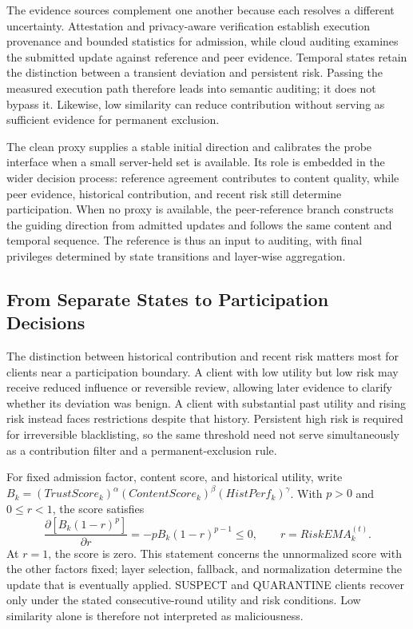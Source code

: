 \documentclass[runningheads,orivec]{llncs}
\begin{document}
The evidence sources complement one another because each resolves a different uncertainty. Attestation and privacy-aware verification establish execution provenance and bounded statistics for admission, while cloud auditing examines the submitted update against reference and peer evidence. Temporal states retain the distinction between a transient deviation and persistent risk. Passing the measured execution path therefore leads into semantic auditing; it does not bypass it. Likewise, low similarity can reduce contribution without serving as sufficient evidence for permanent exclusion.

The clean proxy supplies a stable initial direction and calibrates the probe interface when a small server-held set is available. Its role is embedded in the wider decision process: reference agreement contributes to content quality, while peer evidence, historical contribution, and recent risk still determine participation. When no proxy is available, the peer-reference branch constructs the guiding direction from admitted updates and follows the same content and temporal sequence. The reference is thus an input to auditing, with final privileges determined by state transitions and layer-wise aggregation.

\subsection{From Separate States to Participation Decisions}

The distinction between historical contribution and recent risk matters most for clients near a participation boundary. A client with low utility but low risk may receive reduced influence or reversible review, allowing later evidence to clarify whether its deviation was benign. A client with substantial past utility and rising risk instead faces restrictions despite that history. Persistent high risk is required for irreversible blacklisting, so the same threshold need not serve simultaneously as a contribution filter and a permanent-exclusion rule.

For fixed admission factor, content score, and historical utility, write $B_k=(TrustScore_k)^\alpha(ContentScore_k)^\beta(HistPerf_k)^\gamma$. With $p>0$ and $0\leq r<1$, the score satisfies
\begin{equation}
 \frac{\partial [B_k(1-r)^p]}{\partial r}=-pB_k(1-r)^{p-1}\leq0,
 \qquad r=RiskEMA_k^{(t)}.
\end{equation}
At $r=1$, the score is zero. This statement concerns the unnormalized score with the other factors fixed; layer selection, fallback, and normalization determine the update that is eventually applied. SUSPECT and QUARANTINE clients recover only under the stated consecutive-round utility and risk conditions. Low similarity alone is therefore not interpreted as maliciousness.
\end{document}
